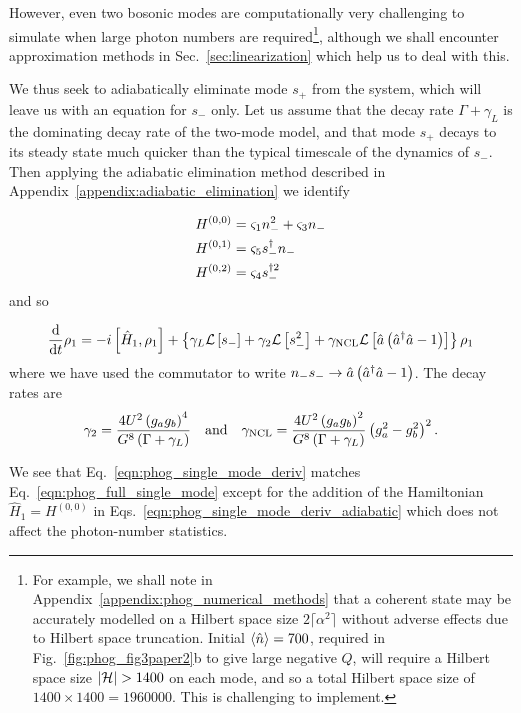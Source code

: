 However, even two bosonic modes are computationally very challenging to simulate when large photon numbers are required\footnote{For example, we shall note in Appendix~\ref{appendix:phog_numerical_methods} that a coherent state may be accurately modelled on a Hilbert space size $2 \lceil \alpha^2 \rceil$ without adverse effects due to Hilbert space truncation. Initial $\ev{\hat{n}} = 700$, required in Fig.~\ref{fig:phog_fig3paper2}b to give large negative $Q$, will require a Hilbert space size $\left|\mathcal{H}\right| > 1400$ on each mode, and so a total Hilbert space size of $1400 \times 1400 = 1960000$. This is challenging to implement.}, although we shall encounter approximation methods in Sec.~\ref{sec:linearization} which help us to deal with this. 

We thus seek to adiabatically eliminate mode $s_+$ from the system, which will leave us with an equation for $s_-$ only. Let us assume that the decay rate $\Gamma + \gamma_L$ is the dominating decay rate of the two-mode model, and that mode $s_+$ decays to its steady state much quicker than the typical timescale of the dynamics of $s_-$. Then applying the adiabatic elimination method described in Appendix~\ref{appendix:adiabatic_elimination} we identify

\begin{align}\label{eqn:phog_single_mode_deriv_adiabatic}
H^{\left(0, 0\right)} &= \varsigma_1 n_-^2 + \varsigma_3 n_- \notag \\ 
%
H^{\left(0, 1\right)} &= \varsigma_5 s_-^\dagger n_- \notag \\
%
H^{\left(0, 2\right)} &= \varsigma_4 s_-^{\dagger 2}
\end{align}
and so

\begin{equation}\label{eqn:phog_single_mode_deriv}
\frac{\mathrm{d}}{\mathrm{d}t} \rho_1 = - i \left[\hat{H}_1, \rho_1\right] + \left\{\gamma_L \mathcal{L}\left[s_-\right] + \gamma_2 \mathcal{L}\left[s_-^2\right] + \gamma_{\text{NCL}} \mathcal{L}\left[\hat{a}\left(\hat{a}^\dagger \hat{a} - 1\right)\right] \right\}\rho_1
\end{equation}
where we have used the commutator to write $n_- s_- \rightarrow \hat{a}\left(\hat{a}^\dagger \hat{a} - 1\right)$. The decay rates are
\begin{equation}
\gamma_2 = \frac{4 U^2 \left(g_a g_b\right)^4}{G^8 \left(\Gamma + \gamma_L\right)} \qq{and} \gncl = \frac{4 U^2 \left(g_a g_b\right)^2}{G^8 \left(\Gamma + \gamma_L\right)}\left(g_a^2 - g_b^2\right)^2.
\end{equation}

\noindent We see that Eq.~\ref{eqn:phog_single_mode_deriv} matches Eq.~\ref{eqn:phog_full_single_mode} except for the addition of the Hamiltonian $\hat{H}_1 = H^{\left(0, 0\right)}$ in Eqs.~\ref{eqn:phog_single_mode_deriv_adiabatic} which does not affect the photon-number statistics. 



